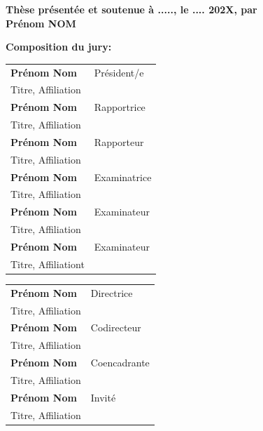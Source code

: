 \begin{titlepage}
\textbf{Thèse présentée et soutenue à ....., le .... 202X, par}\\
\bigskip
\Large {\color{Prune} \textbf{Prénom NOM}}


\vspace{\fill} %

\flushleft \small \textbf{Composition du jury:}
\bigskip



\scriptsize
\begin{tabular}{|p{8cm}l}
\arrayrulecolor{Prune}
\textbf{Prénom Nom} &   Président/e\\ 
Titre, Affiliation & \\
\textbf{Prénom Nom} &  Rapportrice \\ 
Titre, Affiliation   &   \\ 
\textbf{Prénom Nom} &  Rapporteur \\ 
Titre, Affiliation  &   \\ 
\textbf{Prénom Nom} &  Examinatrice \\ 
Titre, Affiliation   &   \\ 
\textbf{Prénom Nom} &  Examinateur \\ 
Titre, Affiliation   &   \\ 
\textbf{Prénom Nom} &  Examinateur \\ 
Titre, Affiliationt   &   \\ 

\end{tabular} 

\medskip
\begin{tabular}{|p{8cm}l}\arrayrulecolor{white}
\textbf{Prénom Nom} &   Directrice\\ 
Titre, Affiliation & \\
\textbf{Prénom Nom} &   Codirecteur\\ 
Titre, Affiliation  &   \\ 
\textbf{Prénom Nom} &   Coencadrante\\ 
Titre, Affiliation  &   \\ 
\textbf{Prénom Nom} &  Invité \\ 
Titre, Affiliation  &   \\ 


\end{tabular} 


\end{titlepage}
\ifthispageodd{\newpage\thispagestyle{empty}\null\newpage}{}
\thispagestyle{empty}
\selectfont

